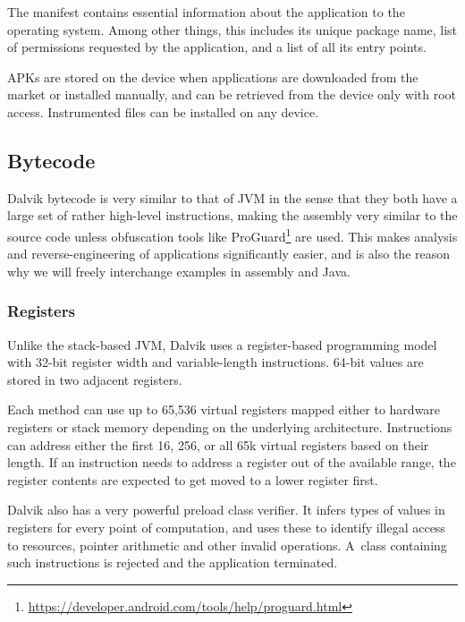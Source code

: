 \documentclass[12pt,twoside,notitlepage]{report}
\newcommand{\weblink}[1] {\footnote{\scriptsize\url{#1}}}
\begin{document}
The manifest contains essential information about the application to the operating system. Among other things, this includes its unique package name, list of permissions requested by the application, and a list of all its entry points.

APKs are stored on the device when applications are downloaded from the market or installed manually, and can be retrieved from the device only with root access. Instrumented files can be installed on any device. 

\subsection{Bytecode}

Dalvik bytecode is very similar to that of JVM in the sense that they both have a large set of rather high-level instructions\cite{web:DalvikBytecode, web:JavaBytecode}, making the assembly very similar to the source code unless obfuscation tools like ProGuard\weblink{https://developer.android.com/tools/help/proguard.html} are used. This makes analysis and reverse-engineering of applications significantly easier, and is also the reason why we will freely interchange examples in assembly and Java.

\subsubsection{Registers}

Unlike the stack-based JVM, Dalvik uses a register-based programming model with 32-bit register width and variable-length instructions\cite{web:DalvikInsnFormat}. 64-bit values are stored in two adjacent registers.

Each method can use up to 65,536 virtual registers mapped either to hardware registers or stack memory depending on the underlying architecture. 
Instructions can address either the first 16, 256, or all 65k virtual registers based on their length. If an instruction needs to address a register out of the available range, the register contents are expected to get moved to a lower register first.

Dalvik also has a very powerful preload class verifier\cite{web:DalvikVerifier, web:DalvikDexopt}. It infers types of values in registers for every point of computation, and uses these to identify illegal access to resources, pointer arithmetic and other invalid operations. A~class containing such instructions is rejected and the application terminated.
\end{document}
